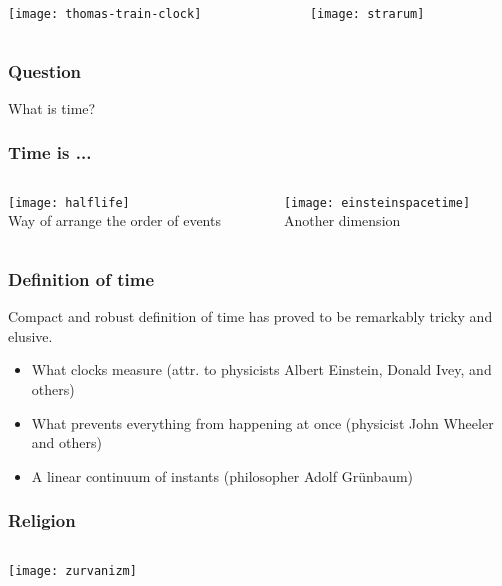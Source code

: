 \documentclass[aspectratio=169, 15pt]{beamer}
\begin{document}
{\begin{gdblank}
\begin{columns}
			\begin{column}{0.5\textwidth}
				\centering\texttt{[image: thomas-train-clock]} 
			\end{column}
			\pause 
			\begin{column}{0.5\textwidth}
				\centering\texttt{[image: strarum]} 
			\end{column}
		\end{columns}            
	\end{gdblank}
	\begin{gdblankclock}
		\frametitle{Question}
		\centering\Huge What is time?           
	\end{gdblankclock} 
	\begin{gdblank}
		\frametitle{Time is ...}
		\begin{columns}
			\begin{column}{0.5\textwidth}
				\centering\texttt{[image: halflife]} 
				\\Way of arrange the order of events 
			\end{column}
			\pause 
			\begin{column}{0.5\textwidth}
				\centering\texttt{[image: einsteinspacetime]} 
				\\Another dimension
			\end{column}
		\end{columns} 
	\end{gdblank} 
	\begin{gdblank}
		\frametitle{Definition of time}
		\LARGE Compact and robust definition of time has proved to be remarkably tricky and elusive.
		\large
		\vskip1cm
		\begin{itemize}
			\item What clocks measure (attr. to physicists Albert Einstein, Donald Ivey, and others)
			      \pause
			\item What prevents everything from happening at once (physicist John Wheeler and others)
			\item A linear continuum of instants (philosopher Adolf Grünbaum)
		\end{itemize}
	\end{gdblank}
	\begin{gdblank}
		\frametitle{Religion}
		\begin{columns}
			\begin{column}{0.5\textwidth}
				\centering\texttt{[image: zurvanizm]} 
			\end{column}
			\begin{column}{0.5\textwidth}

\end{column}
\end{columns}
\end{gdblank}}
\end{document}

